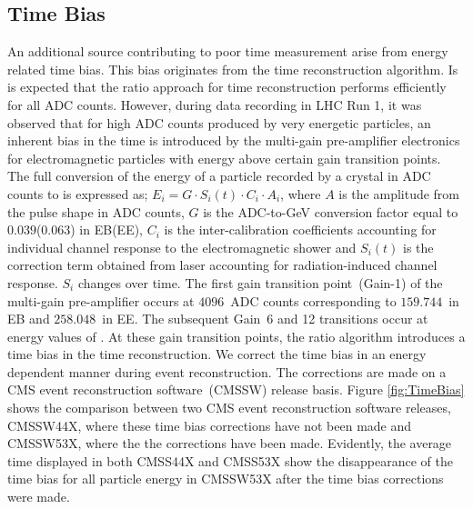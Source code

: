 \subsection{Time Bias}
An additional source contributing to poor time measurement arise from energy related time bias. This bias originates from the time reconstruction algorithm. Is is expected that the ratio approach for time reconstruction performs efficiently for all ADC counts. However, during data recording in LHC Run 1, it was observed that for high ADC counts produced by very energetic particles, an inherent bias in the time is introduced by the multi-gain pre-amplifier electronics for electromagnetic particles with energy above certain gain transition points. 
The full conversion of the energy of a particle recorded by a crystal in ADC counts to \GeV is expressed as; $    E_{i} =  G \cdot S_{i}(t) \cdot C_{i} \cdot A_{i}$, where $A$ is the amplitude from the pulse shape in ADC counts, $G$ is the ADC-to-GeV conversion factor equal to $0.039$($0.063$) in EB(EE), $C_{i}$ is the inter-calibration coefficients accounting for individual channel response to the electromagnetic shower and $S_{i}(t)$ is the correction term obtained from laser accounting for radiation-induced channel response.  $S_{i}$ changes over time.
The first gain transition point~(Gain-1) of the multi-gain pre-amplifier occurs at $4096$~ADC counts corresponding to $159.744$~\GeV in EB and $258.048$~\GeV in EE. The subsequent Gain~6 and 12 transitions occur at energy values of \TeV.
\newline
At these gain transition points, the ratio algorithm introduces a time bias in the time reconstruction.
We correct the time bias in an energy dependent manner during event reconstruction. The corrections are made on a CMS event reconstruction software~(CMSSW) release basis. Figure \ref{fig:TimeBias} shows the comparison between two CMS event reconstruction software releases, CMSSW44X, where these time bias corrections have not been  made and CMSSW53X, where the the corrections have been made. Evidently, the average time displayed in both CMSS44X and CMSS53X show the disappearance of the time bias for all particle energy in CMSSW53X after the time bias corrections were made.
